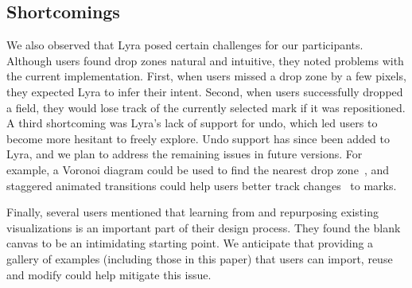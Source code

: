 \subsection{Shortcomings}

We also observed that Lyra posed certain challenges for our participants.
Although users found drop zones natural and intuitive, they noted problems with
the current implementation. First, when users missed a drop zone by a few
pixels, they expected Lyra to infer their intent. Second, when users
successfully dropped a field, they would lose track of the currently selected
mark if it was repositioned. A third shortcoming was Lyra's lack of support for
undo, which led users to become more hesitant to freely explore. Undo support
has since been added to Lyra, and we plan to address the remaining issues in
future versions. For example, a Voronoi diagram could be used to find the
nearest drop zone~\cite{grossman:bubble}, and staggered animated transitions
could help users better track changes~\cite{heer:animated} to marks.

Finally, several users mentioned that learning from and repurposing existing
visualizations is an important part of their design process. They found the
blank canvas to be an intimidating starting point. We anticipate that
providing a gallery of examples (including those in this paper) that users can
import, reuse and modify could help mitigate this issue.
